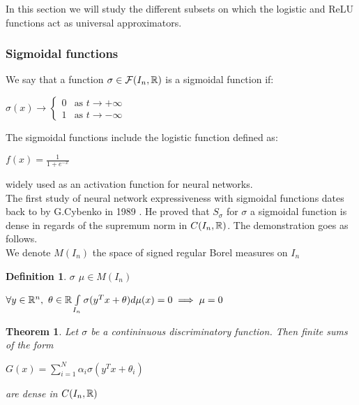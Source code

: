 \documentclass[12pt, a4paper]{article}
\newtheorem{theorem}{Theorem}
\newtheorem{definition}{Definition}
\begin{document}
In this section we will study the different subsets on which the logistic and ReLU functions act as universal approximators.\\ 

\subsubsection{Sigmoidal functions}

We say that a function $\sigma \in \mathcal{F}(I_n, \mathbb{R})$ is a sigmoidal function if:

\begin{center}
  $\sigma(x) \to
  \begin{cases}
    0 &\text{as $t \to +\infty$}\\
    1 &\text{as $t \to -\infty$}
  \end{cases}$
\end{center}

The sigmoidal functions include the logistic function defined as:

\begin{center}
  $f(x) = \frac{1}{1+e^{-x}}$
\end{center}

widely used as an activation function for neural networks.\\

The first study of neural network expressiveness with sigmoidal functions dates back to by G.Cybenko in 1989 \cite{cybenko_approximation_1989}. He proved that $S_\sigma$ for $\sigma$ a sigmoidal function is dense in regards of the supremum norm in $C(I_n, \mathbb{R})$. The demonstration goes as follows.\\

We denote $M(I_n)$ the space of signed regular Borel measures on $I_n$\\

\begin{definition}
  $\sigma$  $\mu \in M(I_n)$ \\ 
  \begin{center}
  $\forall y \in \mathbb{R}^n,$ $\theta \in \mathbb{R} \int\limits_{I_n} \sigma(y^Tx + \theta) d\mu(x) = 0 \implies \mu = 0$
\end{center}
\end{definition}

\begin{theorem}
  Let $\sigma$ be a contininuous discriminatory function. Then finite sums of the form\\\begin{center}
    $G(x) = \sum\limits_{i=1}^N \alpha_i \sigma(y^Tx + \theta_i)$
  \end{center}
  are dense in $C(I_n, \mathbb{R})$
\end{theorem}
\end{document}
